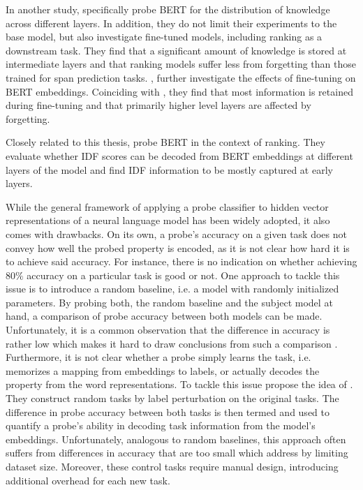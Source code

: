 In another study, \citet{singh-etal-2020-bertnesia} specifically probe BERT for the distribution of knowledge across different layers. In addition, they do not limit their experiments to the base model, but also investigate fine-tuned models, including ranking as a downstream task. They find that a significant amount of knowledge is stored at intermediate layers and that ranking models suffer less from forgetting than those trained for span prediction tasks. \citet{merchant-etal-2020-happens}, further investigate the effects of fine-tuning on BERT embeddings. Coinciding with \citet{singh-etal-2020-bertnesia}, they find that most information is retained during fine-tuning and that primarily higher level layers are affected by forgetting.

Closely related to this thesis, \citet{https://doi.org/10.48550/arxiv.2202.12191} probe BERT in the context of ranking. They evaluate whether IDF scores can be decoded from BERT embeddings at different layers of the model and find IDF information to be mostly captured at early layers.

While the general framework of applying a probe classifier to hidden vector representations of a neural language model has been widely adopted, it also comes with drawbacks. On its own, a probe's accuracy on a given task does not convey how well the probed property is encoded, as it is not clear how hard it is to achieve said accuracy. For instance, there is no indication on whether achieving $80\%$ accuracy on a particular task is good or not.
One approach to tackle this issue is to introduce a random baseline, i.e. a model with randomly initialized parameters. By probing both, the random baseline and the subject model at hand, a comparison of probe accuracy between both models can be made. Unfortunately, it is a common observation that the difference in accuracy is rather low which makes it hard to draw conclusions from such a comparison \citep{zhang-bowman-2018-language}.
Furthermore, it is not clear whether a probe simply learns the task, i.e. memorizes a mapping from embeddings to labels, or actually decodes the property from the word representations. To tackle this issue \citet{hewitt-liang-2019-designing} propose the idea of . They construct random tasks by label perturbation on the original tasks. The difference in probe accuracy between both tasks is then termed  and used to quantify a probe's ability in decoding task information from the model's embeddings. Unfortunately, analogous to random baselines, this approach often suffers from differences in accuracy that are too small which \citet{hewitt-liang-2019-designing} address by limiting dataset size. Moreover, these control tasks require manual design, introducing additional overhead for each new task.


